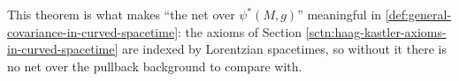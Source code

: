 \medskip

This theorem is what makes ``the net over $\psi^*(M,g)$'' meaningful in \ref{def:general-covariance-in-curved-spacetime}: the axioms of Section \ref{sctn:haag-kastler-axioms-in-curved-spacetime} are indexed by Lorentzian spacetimes, so without it there is no net over the pullback background to compare with.
